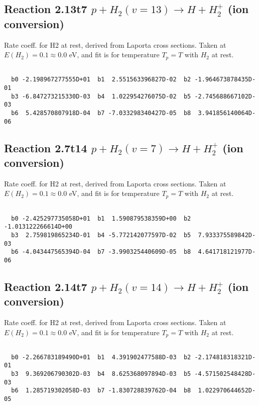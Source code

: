 \documentclass[12pt,dvipdfmx]{article}
\begin{document}
\newpage
\subsection{
Reaction 2.13t7
$ p + H_2(v=13) \rightarrow H + H_2^+$ (ion conversion)
}
Rate coeff. for H2 at rest, derived from Laporta cross sections.
Taken at $E(H_2) = 0.1 \approx 0.0$ eV,  and fit is for temperature $T_p=T$ with $H_2$ at rest.

\begin{small}\begin{verbatim}

  b0 -2.198967277555D+01  b1  2.551563396827D-02  b2 -1.964673878435D-01
  b3 -6.847273215330D-03  b4  1.022954276075D-02  b5 -2.745688667102D-03
  b6  5.428570807918D-04  b7 -7.033298340427D-05  b8  3.941856140064D-06

\end{verbatim}\end{small}

\newpage
\subsection{
Reaction 2.7t14
$ p + H_2(v=7) \rightarrow H + H_2^+$ (ion conversion)
}
Rate coeff. for H2 at rest, derived from Laporta cross sections.
Taken at $E(H_2) = 0.1 \approx 0.0$ eV,  and fit is for temperature $T_p=T$ with $H_2$ at rest.

\begin{small}\begin{verbatim}

  b0 -2.425297735058D+01  b1  1.590879538359D+00  b2 -1.013122266614D+00
  b3  2.759819865234D-01  b4 -5.772142077597D-02  b5  7.933375589842D-03
  b6 -4.043447565394D-04  b7 -3.990325440609D-05  b8  4.641718121977D-06

\end{verbatim}\end{small}

\newpage
\subsection{
Reaction 2.14t7
$ p + H_2(v=14) \rightarrow H + H_2^+$ (ion conversion)
}
Rate coeff. for H2 at rest, derived from Laporta cross sections.
Taken at $E(H_2) = 0.1 \approx 0.0$ eV,  and fit is for temperature $T_p=T$ with $H_2$ at rest.

\begin{small}\begin{verbatim}

  b0 -2.266783189490D+01  b1  4.391902477588D-03  b2 -2.174818318321D-01
  b3  9.369206790302D-03  b4  8.625368097894D-03  b5 -4.571502548428D-03
  b6  1.285719302058D-03  b7 -1.830728839762D-04  b8  1.022970644652D-05

\end{verbatim}\end{small}
\end{document}
